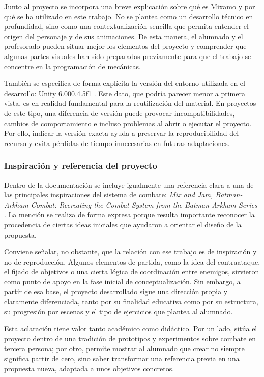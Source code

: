 \documentclass[a4paper,12pt]{article}
\begin{document}
Junto al proyecto se incorpora una breve explicación sobre qué es Mixamo y por qué se ha utilizado en este trabajo. No se plantea como un desarrollo técnico en profundidad, sino como una contextualización sencilla que permita entender el origen del personaje y de sus animaciones. De esta manera, el alumnado y el profesorado pueden situar mejor los elementos del proyecto y comprender que algunas partes visuales han sido preparadas previamente para que el trabajo se concentre en la programación de mecánicas.

También se especifica de forma explícita la versión del entorno utilizada en el desarrollo: Unity 6.000.4.5f1 \cite{unityDocs}. Este dato, que podría parecer menor a primera vista, es en realidad fundamental para la reutilización del material. En proyectos de este tipo, una diferencia de versión puede provocar incompatibilidades, cambios de comportamiento e incluso problemas al abrir o ejecutar el proyecto. Por ello, indicar la versión exacta ayuda a preservar la reproducibilidad del recurso y evita pérdidas de tiempo innecesarias en futuras adaptaciones.

\subsubsection{Inspiración y referencia del proyecto}

Dentro de la documentación se incluye igualmente una referencia clara a una de las principales inspiraciones del sistema de combate: \textit{Mix and Jam, Batman-Arkham-Combat: Recreating the Combat System from the Batman Arkham Series}\cite{batmanArkhamCombat} \cite{dotween}. La mención se realiza de forma expresa porque resulta importante reconocer la procedencia de ciertas ideas iniciales que ayudaron a orientar el diseño de la propuesta.

Conviene señalar, no obstante, que la relación con ese trabajo es de inspiración y no de reproducción. Algunos elementos de partida, como la idea del contraataque, el fijado de objetivos o una cierta lógica de coordinación entre enemigos, sirvieron como punto de apoyo en la fase inicial de conceptualización. Sin embargo, a partir de esa base, el proyecto desarrollado sigue una dirección propia y claramente diferenciada, tanto por su finalidad educativa como por su estructura, su progresión por escenas y el tipo de ejercicios que plantea al alumnado.

Esta aclaración tiene valor tanto académico como didáctico. Por un lado, sitúa el proyecto dentro de una tradición de prototipos y experimentos sobre combate en tercera persona; por otro, permite mostrar al alumnado que crear no siempre significa partir de cero, sino saber transformar una referencia previa en una propuesta nueva, adaptada a unos objetivos concretos.
\end{document}
